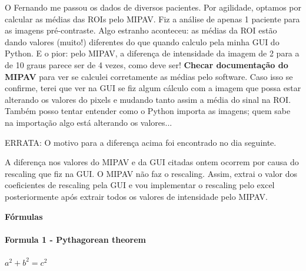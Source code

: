 \documentclass[idxtotoc,hyperref,openany]{labbook} %
\begin{document}
O Fernando me passou os dados de diversos pacientes. Por agilidade, optamos por calcular as médias das ROIs pelo MIPAV. Fiz a análise de apenas 1 paciente para as imagens pré-contraste. Algo estranho aconteceu: as médias da ROI estão dando valores (muito!) diferentes do que quando calculo pela minha GUI do Python. E o pior: pelo MIPAV, a diferença de intensidade da imagem de 2 para a de 10 graus parece ser de 4 vezes, como deve ser! \textbf{Checar documentação do MIPAV} para ver se calculei corretamente as médias pelo software. Caso isso se confirme, terei que ver na GUI se fiz algum cálculo com a imagem que possa estar alterando os valores do pixels e mudando tanto assim a média do sinal na ROI. Também posso tentar entender como o Python importa as imagens; quem sabe na importação algo está alterando os valores...

ERRATA: O motivo para a diferença acima foi encontrado no dia seguinte.



A diferença nos valores do MIPAV e da GUI citadas ontem ocorrem por causa do rescaling que fiz na GUI. O MIPAV não faz o rescaling. Assim, extrai o valor dos coeficientes de rescaling pela GUI e vou implementar o rescaling pelo excel posteriormente após extrair todos os valores de intensidade pelo MIPAV.











\newpage

\huge \textbf{Fórmulas} \\ \\

\normalsize \textbf{Formula 1 - Pythagorean theorem}\\ \\
$a^2 + b^2 = c^2$\\ \\




\end{document}
